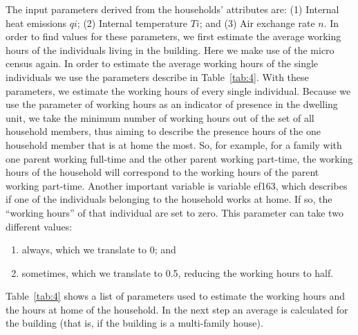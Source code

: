 \documentclass[11pt]{IJM-article}
\begin{document}
The input parameters derived from the households' attributes are: (1) Internal
heat emissions $qi$; (2) Internal temperature $Ti$; and (3) Air exchange rate
$n$. In order to find values for these parameters, we first estimate the
average working hours of the individuals living in the building.  Here we make
use of the micro census again. In order to estimate the average working hours
of the single individuals we use the parameters describe in Table~\ref{tab:4}.
With these parameters, we estimate the working hours of every single
individual. Because we use the parameter of working hours as an indicator of
presence in the dwelling unit, we take the minimum number of working hours out
of the set of all household members, thus aiming to describe the presence hours
of the one household member that is at home the most. So, for example, for a
family with one parent working full-time and the other parent working
part-time, the working hours of the household will correspond to the working
hours of the parent working part-time. Another important variable is variable
ef163, which describes if one of the individuals belonging to the household
works at home. If so, the ``working hours'' of that individual are set to zero.
This parameter can take two different values:

\begin{enumerate}
    \item always, which we translate to 0; and
    \item sometimes, which we translate to 0.5, reducing the working hours to
        half.
\end{enumerate}\pb

Table~\ref{tab:4} shows a list of parameters used to estimate the working hours
and the hours at home of the household. In the next step an average is
calculated for the building (that is, if the building is a multi-family
house).\\
\end{document}
